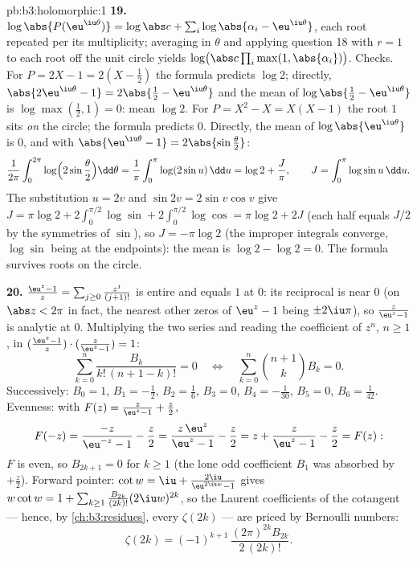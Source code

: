 \begin{solution}{pb:b3:holomorphic:1}
\textbf{19.} $\log\abs{P(\eu^{\iu\theta})} = \log\abs c +
\sum_i\log\abs{\alpha_i - \eu^{\iu\theta}}$, each root
repeated per its multiplicity; averaging in $\theta$ and
applying question 18 with $r = 1$ to each root off the unit
circle yields $\log\bigl(\abs c\prod_i\max(1,
\abs{\alpha_i})\bigr)$. Checks. For $P = 2X - 1 = 2(X -
\frac12)$ the formula predicts $\log 2$; directly,
$\abs{2\eu^{\iu\theta} - 1} = 2\abs{\frac12 -
\eu^{\iu\theta}}$ and the mean of $\log\abs{\frac12 -
\eu^{\iu\theta}}$ is $\log\max(\frac12, 1) = 0$: mean $\log
2$. For $P = X^2 - X = X(X - 1)$ the root $1$ sits \emph{on}
the circle; the formula predicts $0$. Directly, the mean of
$\log\abs{\eu^{\iu\theta}}$ is $0$, and with
$\abs{\eu^{\iu\theta} - 1} = 2\abs{\sin\frac\theta2}$:
\[
\frac1{2\pi}\int_0^{2\pi}
\log\Bigl(2\sin\frac\theta2\Bigr)\dd\theta
= \frac1\pi\int_0^\pi\log(2\sin u)\,\dd u
= \log 2 + \frac J\pi,
\qquad J = \int_0^\pi\log\sin u\,\dd u .
\]
The substitution $u = 2v$ and $\sin 2v = 2\sin v\cos v$ give
$J = \pi\log2 + 2\int_0^{\pi/2}\log\sin +
2\int_0^{\pi/2}\log\cos = \pi\log 2 + 2J$ (each half equals
$J/2$ by the symmetries of $\sin$), so $J = -\pi\log 2$ (the
improper integrals converge, $\log\sin$ being  at
the endpoints): the mean is $\log2 - \log2 = 0$. The formula
survives roots on the circle.

\textbf{20.} $\frac{\eu^z - 1}z =
\sum_{j\geq0}\frac{z^j}{(j+1)!}$ is entire and equals $1$ at
$0$: its reciprocal is  near $0$ (on $\abs z <
2\pi$ in fact, the nearest other zeros of $\eu^z - 1$ being
$\pm2\iu\pi$), so $\frac z{\eu^z-1}$ is analytic at $0$.
Multiplying the two series and reading the coefficient of
$z^n$, $n \geq 1$, in $(\frac{\eu^z-1}z)\cdot(\frac
z{\eu^z-1}) = 1$:
\[
\sum_{k=0}^{n}\frac{B_k}{k!\,(n+1-k)!} = 0
\quad\Longleftrightarrow\quad
\sum_{k=0}^{n}\binom{n+1}{k}B_k = 0 .
\]
Successively: $B_0 = 1$, $B_1 = -\frac12$, $B_2 = \frac16$,
$B_3 = 0$, $B_4 = -\frac1{30}$, $B_5 = 0$, $B_6 =
\frac1{42}$. Evenness: with $F(z) = \frac z{\eu^z-1} +
\frac z2$,
\[
F(-z) = \frac{-z}{\eu^{-z} - 1} - \frac z2
= \frac{z\,\eu^z}{\eu^z - 1} - \frac z2
= z + \frac{z}{\eu^z - 1} - \frac z2 = F(z) :
\]
$F$ is even, so $B_{2k+1} = 0$ for $k \geq 1$ (the lone odd
coefficient $B_1$ was absorbed by $+\frac z2$). Forward
pointer: $\cot w = \iu + \frac{2\iu}{\eu^{2\iu w}-1}$ gives
$w\cot w = 1 + \sum_{k\geq1}\frac{B_{2k}}{(2k)!}(2\iu
w)^{2k}$, so the Laurent coefficients of the cotangent ---
hence, by \cref{ch:b3:residues}, every $\zeta(2k)$ --- are
priced by Bernoulli numbers:
\[
\zeta(2k) = (-1)^{k+1}\,\frac{(2\pi)^{2k}B_{2k}}{2\,(2k)!} .
\]


\end{solution}
